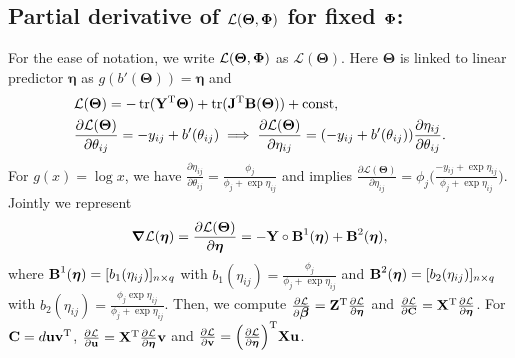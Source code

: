 \documentclass[12pt]{article}
\def\trans{^{\rm T}}
\newcommand{\bbL}{\mathcal{L}}
\newcommand{\bs}{\boldsymbol}
\DeclareMathOperator{\Tr}{tr}
\begin{document}
\subsection{Partial derivative of $ \bbL(\bs\Theta,\bPhi)$ for fixed $\mbox{\boldmath $\Phi$}$: } 
For the ease of notation, we write $ \bbL(\bs\Theta,\bPhi)$ as $ \bbL(\bs\Theta)$. 
Here $\bs\Theta$ is linked to linear predictor $\bs\eta$ as $g(b'(\bs\Theta)) = \bs\eta$ and 
\begin{align*}
&\bbL(\bs\Theta)  = - \Tr(\Y\trans \bs\Theta) + \Tr({\J}\trans \bB(\bs\Theta)) + \M{const}, \\
&\frac{\partial\bbL(\bs\Theta) }{\partial \theta_{ij}} = - y_{ij} + b'(\theta_{ij}) \implies \frac{\partial\bbL(\bs\Theta) }{\partial \eta_{ij}}   = (- y_{ij} + b'(\theta_{ij}) ) \frac{\partial \eta_{ij} }{\partial \theta_{ij}}. 
\end{align*}
For $g(x) = \log{x}$, we have  $\frac{\partial \eta_{ij} }{\partial \theta_{ij}} = \frac{\phi_j}{\phi_j + \exp{\eta_{ij}}} $ and implies $\frac{\partial\bbL(\bs\Theta) }{\partial \eta_{ij}} = \phi_j \Big( \frac{-y_{ij} +\exp {\eta_{ij}} }{\phi_j + \exp {\eta_{ij}}} \Big)$. Jointly we represent
\begin{align*}
\bs\nabla \bbL(\bs\eta) =  \frac{\partial\bbL(\bs\Theta) }{\partial \bs\eta}  = -\Y\circ \bB^{1}(\bs\eta) +  \bB^{2}(\bs\eta),
\end{align*} 
where $ \bB^{1}(\bs\eta)  = [b_1(\eta_{ij})]_{n \times q}$ with $b_1(\eta_{ij}) = \frac{\phi_j}{\phi_j + \exp{\eta_{ij}}}$ and  $ \bB^{2}(\bs\eta)  = [b_2(\eta_{ij})]_{n \times q}$ with $b_2(\eta_{ij}) = \frac{\phi_j \exp{\eta_{ij}}}{\phi_j + \exp{\eta_{ij}}}$. Then, we compute $\frac{\partial\bbL }{\partial \bbeta} = \Z\trans\frac{\partial\bbL }{\partial \bs\eta}$ and $\frac{\partial\bbL }{\partial \C} = \X\trans\frac{\partial\bbL }{\partial \bs\eta}$. For $\C = d\u\v\trans$,   $\frac{\partial\bbL }{\partial \u} = \X\trans\frac{\partial\bbL }{\partial \bs\eta}\v$ and  $\frac{\partial\bbL }{\partial \v} =  \Big(\frac{\partial\bbL }{\partial \bs\eta} \Big)\trans\X\u$.  


\end{document}

